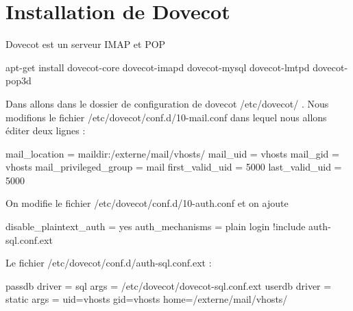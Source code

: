 \documentclass[a4paper,12pt,french]{report} %
\begin{document}
\section{Installation de Dovecot}
Dovecot est un serveur IMAP et POP 
\begin{exempleConsole}
apt-get install dovecot-core dovecot-imapd dovecot-mysql dovecot-lmtpd dovecot-pop3d
\end{exempleConsole}
Dans allons dans le dossier de configuration de dovecot /etc/dovecot/ .
Nous modifions le fichier /etc/dovecot/conf.d/10-mail.conf dans lequel nous allons éditer deux lignes :
\begin{exempleConsole}
mail_location = maildir:/externe/mail/vhosts/%
mail_uid = vhosts
mail_gid = vhosts
mail_privileged_group = mail
first_valid_uid = 5000
last_valid_uid = 5000
\end{exempleConsole}
On modifie le fichier /etc/dovecot/conf.d/10-auth.conf et on ajoute 
\begin{exempleConsole}
disable_plaintext_auth = yes
auth_mechanisms = plain login
!include auth-sql.conf.ext
\end{exempleConsole}

Le fichier /etc/dovecot/conf.d/auth-sql.conf.ext :
\begin{exempleConsole}
passdb {
  driver = sql
  args = /etc/dovecot/dovecot-sql.conf.ext
}
userdb {
  driver = static
  args = uid=vhosts gid=vhosts home=/externe/mail/vhosts/%
}
\end{exempleConsole}
\end{document}
